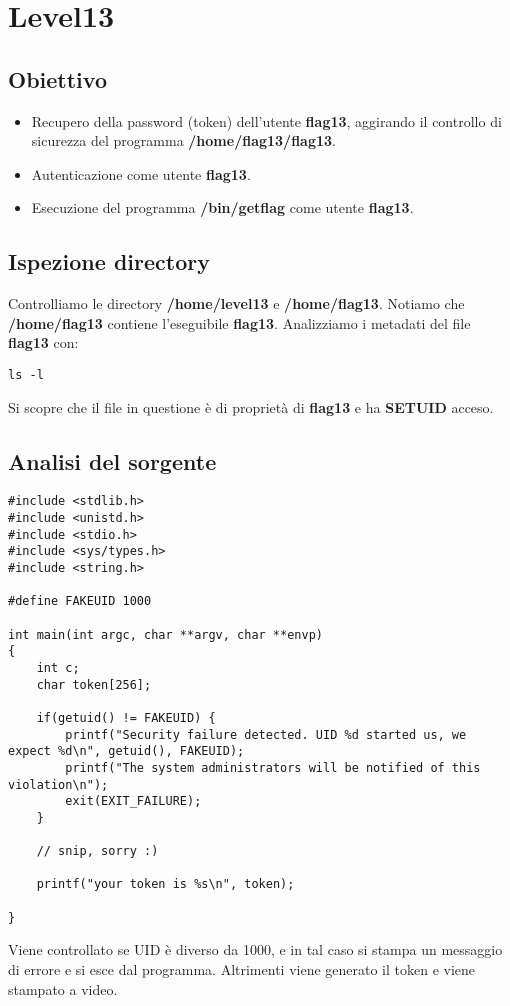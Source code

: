 \section{Level13}
\subsection{Obiettivo}
\begin{itemize}
    \item Recupero della password (token) dell’utente \textbf{flag13}, aggirando il controllo di sicurezza del programma \textbf{/home/flag13/flag13}.
    \item Autenticazione come utente \textbf{flag13}.
    \item Esecuzione del programma \textbf{/bin/getflag} come utente \textbf{flag13}.
\end{itemize}

\subsection{Ispezione directory}
Controlliamo le directory \textbf{/home/level13} e \textbf{/home/flag13}. Notiamo che \textbf{/home/flag13} contiene l’eseguibile \textbf{flag13}.
Analizziamo i metadati del file \textbf{flag13} con: 
\begin{lstlisting}[style=bashstyle]
    ls -l
\end{lstlisting}
Si scopre che il file in questione è di proprietà di \textbf{flag13} e ha \textbf{SETUID} acceso.

\subsection{Analisi del sorgente}
\begin{lstlisting}[style=cstyle]
#include <stdlib.h>
#include <unistd.h>
#include <stdio.h>
#include <sys/types.h>
#include <string.h>

#define FAKEUID 1000

int main(int argc, char **argv, char **envp)
{
    int c;
    char token[256];

    if(getuid() != FAKEUID) {
        printf("Security failure detected. UID %d started us, we expect %d\n", getuid(), FAKEUID);
        printf("The system administrators will be notified of this violation\n");
        exit(EXIT_FAILURE);
    }

    // snip, sorry :)

    printf("your token is %s\n", token);

}
\end{lstlisting}
Viene controllato se UID è diverso da 1000, e in tal caso si stampa un messaggio di errore e si esce dal programma.
Altrimenti viene generato il token e viene stampato a video.

